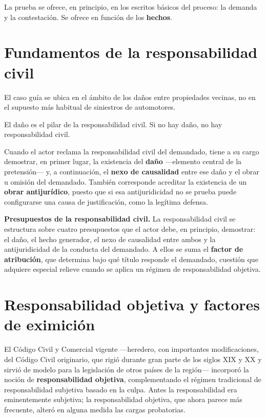 \documentclass[12pt,oneside]{book}
\begin{document}
La prueba se ofrece, en principio, en los escritos básicos del proceso: la demanda y la contestación. Se ofrece en función de los \textbf{hechos}.

\section{Fundamentos de la responsabilidad civil}

El caso guía se ubica en el ámbito de los daños entre propiedades vecinas, no en el supuesto más habitual de siniestros de automotores.

\begin{important}
El daño es el pilar de la responsabilidad civil. Si no hay daño, no hay responsabilidad civil.
\end{important}

Cuando el actor reclama la responsabilidad civil del demandado, tiene a su cargo demostrar, en primer lugar, la existencia del \textbf{daño} ---elemento central de la pretensión--- y, a continuación, el \textbf{nexo de causalidad} entre ese daño y el obrar u omisión del demandado. También corresponde acreditar la existencia de un \textbf{obrar antijurídico}, puesto que si esa antijuridicidad no se prueba puede configurarse una causa de justificación, como la legítima defensa.

\begin{note}
\textbf{Presupuestos de la responsabilidad civil.} La responsabilidad civil se estructura sobre cuatro presupuestos que el actor debe, en principio, demostrar: el daño, el hecho generador, el nexo de causalidad entre ambos y la antijuridicidad de la conducta del demandado. A ellos se suma el \textbf{factor de atribución}, que determina bajo qué título responde el demandado, cuestión que adquiere especial relieve cuando se aplica un régimen de responsabilidad objetiva.
\end{note}

\section{Responsabilidad objetiva y factores de eximición}

El Código Civil y Comercial vigente ---heredero, con importantes modificaciones, del Código Civil originario, que rigió durante gran parte de los siglos XIX y XX y sirvió de modelo para la legislación de otros países de la región--- incorporó la noción de \textbf{responsabilidad objetiva}, complementando el régimen tradicional de responsabilidad subjetiva basado en la culpa. Antes la responsabilidad era eminentemente subjetiva; la responsabilidad objetiva, que ahora parece más frecuente, alteró en alguna medida las cargas probatorias.
\end{document}
